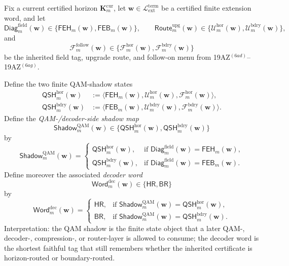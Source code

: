 \begin{definition}
\label{def:qam-decoder-side-shadow-state}
Fix a current certified horizon \(\mathbf K_m^{\mathrm{cur}}\), let \(\mathbf w\in \mathcal L_{\mathrm{ext}}^{\mathrm{term}}\) be a certified finite extension word, and let
\[
 \mathsf{Diag}^{\mathrm{field}}_{m}(\mathbf w)
 \in
 \{\mathsf{FEH}_{m}(\mathbf w),\mathsf{FEB}_{m}(\mathbf w)\},
 \qquad
 \mathsf{Route}^{\mathrm{upg}}_{m}(\mathbf w)
 \in
 \{\mathcal U^{\mathrm{hor}}_{m}(\mathbf w),\mathcal U^{\mathrm{bdry}}_{m}(\mathbf w)\},
\]
and
\[
 \mathcal F^{\mathrm{follow}}_{m}(\mathbf w)
 \in
 \{\mathcal F^{\mathrm{hor}}_{m}(\mathbf w),\mathcal F^{\mathrm{bdry}}_{m}(\mathbf w)\}
\]
be the inherited field tag, upgrade route, and follow-on menu from 19AZ$^{(6ad)}$--19AZ$^{(6ag)}$.

Define the two finite QAM-shadow states
\begin{align*}
 \mathsf{QSH}^{\mathrm{hor}}_{m}(\mathbf w)
 &:=
 \bigl\langle
 \mathsf{FEH}_{m}(\mathbf w),
 \mathcal U^{\mathrm{hor}}_{m}(\mathbf w),
 \mathcal F^{\mathrm{hor}}_{m}(\mathbf w)
 \bigr\rangle,\\
 \mathsf{QSH}^{\mathrm{bdry}}_{m}(\mathbf w)
 &:=
 \bigl\langle
 \mathsf{FEB}_{m}(\mathbf w),
 \mathcal U^{\mathrm{bdry}}_{m}(\mathbf w),
 \mathcal F^{\mathrm{bdry}}_{m}(\mathbf w)
 \bigr\rangle.
\end{align*}
Define the \emph{QAM-/decoder-side shadow map}
\[
 \mathsf{Shadow}^{\mathrm{QAM}}_{m}(\mathbf w)
 \in
 \{\mathsf{QSH}^{\mathrm{hor}}_{m}(\mathbf w),\mathsf{QSH}^{\mathrm{bdry}}_{m}(\mathbf w)\}
\]
by
\[
 \mathsf{Shadow}^{\mathrm{QAM}}_{m}(\mathbf w)
 =
 \begin{cases}
 \mathsf{QSH}^{\mathrm{hor}}_{m}(\mathbf w), & \text{if }\mathsf{Diag}^{\mathrm{field}}_{m}(\mathbf w)=\mathsf{FEH}_{m}(\mathbf w),\\[2mm]
 \mathsf{QSH}^{\mathrm{bdry}}_{m}(\mathbf w), & \text{if }\mathsf{Diag}^{\mathrm{field}}_{m}(\mathbf w)=\mathsf{FEB}_{m}(\mathbf w).
 \end{cases}
\]
Define moreover the associated \emph{decoder word}
\[
 \mathsf{Word}^{\mathrm{dec}}_{m}(\mathbf w)
 \in
 \{\mathsf{HR},\mathsf{BR}\}
\]
by
\[
 \mathsf{Word}^{\mathrm{dec}}_{m}(\mathbf w)
 =
 \begin{cases}
 \mathsf{HR}, & \text{if }\mathsf{Shadow}^{\mathrm{QAM}}_{m}(\mathbf w)=\mathsf{QSH}^{\mathrm{hor}}_{m}(\mathbf w),\\[2mm]
 \mathsf{BR}, & \text{if }\mathsf{Shadow}^{\mathrm{QAM}}_{m}(\mathbf w)=\mathsf{QSH}^{\mathrm{bdry}}_{m}(\mathbf w).
 \end{cases}
\]
Interpretation: the QAM shadow is the finite state object that a later QAM-, decoder-, compression-, or router-layer is allowed to consume; the decoder word is the shortest faithful tag that still remembers whether the inherited certificate is horizon-routed or boundary-routed.
\end{definition}

